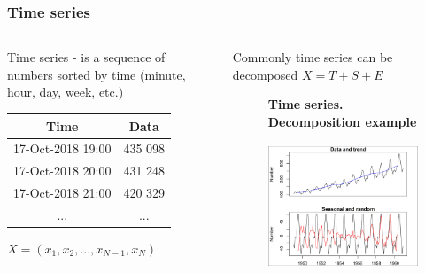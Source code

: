 \documentclass[intlimits, 9pt, unicode]{beamer}
\begin{document}
\begin{frame}
    \frametitle{Time series}
	
    {\begin{columns}
        \begin{column}{5cm}
 Time series - is a sequence of numbers sorted by time (minute, hour, day, week, etc.)

\begin{table}[h!]
\centering
 \begin{tabular}{||c c||} 
 \hline
 Time & Data \\ [0.5ex] 
 \hline\hline
 17-Oct-2018 19:00 & 435 098 \\ 
 \hline
 17-Oct-2018 20:00 & 431 248  \\
 \hline
 17-Oct-2018 21:00 & 420 329  \\
 \hline
 ... & ... \\ [1ex] 
 \hline
\end{tabular}
\end{table}

	
 $ X = (x_1, x_2, ... , x_{N-1} , x_N)  $

        \end{column}

        \begin{column}{5cm}
Commonly time series can be decomposed $X = T + S + E$
        \begin{figure}
        \centering 
	\textbf{Time series. Decomposition example}
        \includegraphics[height=4.5cm]{images/tsDecompPlot}
	\end{figure}
	
        \end{column}
    \end{columns}}
\end{frame}
\end{document}
